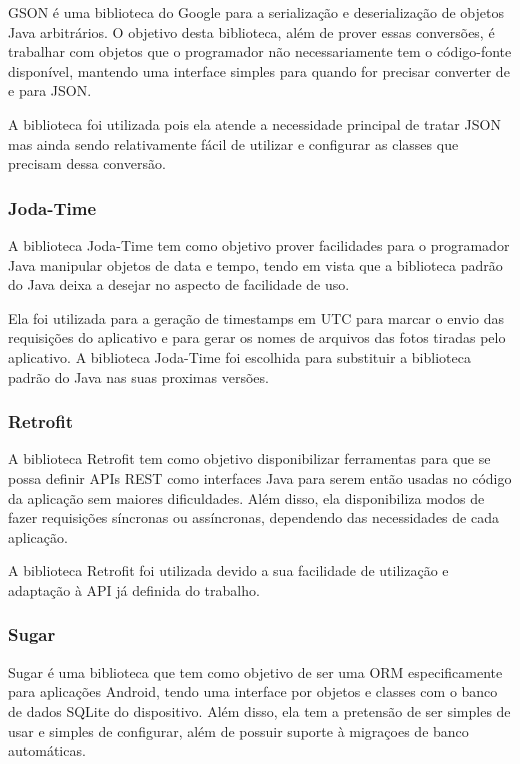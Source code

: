 \documentclass[
	article,			%
	11pt,				%
	oneside,			%
	a4paper,			%
	english,			%
	brazil,				%
	sumario=tradicional
	]{abntex2}
\begin{document}
GSON é uma biblioteca do Google para a serialização e deserialização de objetos Java arbitrários.
O objetivo desta biblioteca, além de prover essas conversões, é trabalhar com objetos que o programador não necessariamente tem o código-fonte disponível, mantendo uma interface simples para quando for precisar converter de e para JSON. \cite{gson}

A biblioteca foi utilizada pois ela atende a necessidade principal de tratar JSON mas ainda sendo relativamente fácil de utilizar e configurar as classes que precisam dessa conversão.

\subsubsection{Joda-Time}

A biblioteca Joda-Time tem como objetivo prover facilidades para o programador Java manipular objetos de data e tempo, tendo em vista que a biblioteca padrão do Java deixa a desejar no aspecto de facilidade de uso.

Ela foi utilizada para a geração de timestamps em UTC para marcar o envio das requisições do aplicativo e para gerar os nomes de arquivos das fotos tiradas pelo aplicativo.
A biblioteca Joda-Time foi escolhida para substituir a biblioteca padrão do Java nas suas proximas versões.\cite{jodatime}

\subsubsection{Retrofit}

A biblioteca Retrofit tem como objetivo disponibilizar ferramentas para que se possa definir APIs REST como interfaces Java para serem então usadas no código da aplicação sem maiores dificuldades.
Além disso, ela disponibiliza modos de fazer requisições síncronas ou assíncronas, dependendo das necessidades de cada aplicação.\cite{retrofit}

A biblioteca Retrofit foi utilizada devido a sua facilidade de utilização e adaptação à API já definida do trabalho.

\subsubsection{Sugar}

Sugar é uma biblioteca que tem como objetivo de ser uma ORM especificamente para aplicações Android, tendo uma interface por objetos e classes com o banco de dados SQLite do dispositivo.
Além disso, ela tem a pretensão de ser simples de usar e simples de configurar, além de possuir suporte à migraçoes de banco automáticas.\cite{sugar}
\end{document}
